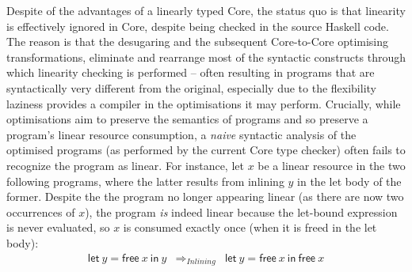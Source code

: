 \documentclass[acmsmall,review]{acmart}
\newcommand{\llet}[2]{\mathsf{let}~#1~\mathsf{in}~#2}
\begin{document}

%

Despite of the advantages of a linearly typed Core, the status quo is
that linearity is effectively ignored in Core, despite being checked
in the source Haskell code. The reason is that the desugaring
and the subsequent Core-to-Core optimising transformations,
eliminate and rearrange most of the syntactic constructs through
which linearity checking is performed -- often resulting in programs
that are syntactically very different from the original, especially
due to the flexibility laziness provides a compiler in the
optimisations it may perform.
%
Crucially, while optimisations aim to preserve the semantics of
programs and so preserve a program's linear resource consumption,
a \emph{naive} syntactic analysis of the optimised programs (as
performed by the current Core type checker) often fails to recognize
the program as linear.
%
For instance, let $x$ be a linear resource in the two following programs, where
the latter results from inlining $y$ in the let body of the former. Despite the
the program no longer appearing linear (as there are now two 
occurrences of $x$), the program \emph{is} indeed linear
because the let-bound expression is never evaluated, so $x$ is
consumed exactly once (when it is freed in the let body):
%
\[
\begin{array}{ccc}
\llet{y = \textsf{free}~x}{y} & \Longrightarrow_{Inlining} & \llet{y = \textsf{free}~x}{\textsf{free}~x}
\end{array}
\]
\end{document}
